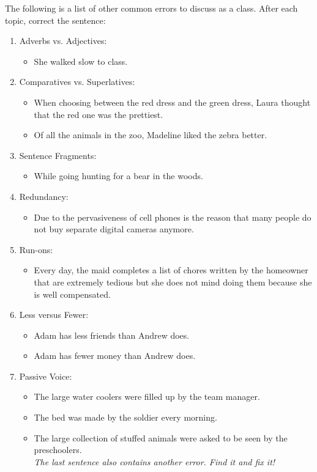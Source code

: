 \documentclass[12pt]{book}
\begin{document}
The following is a list of other common errors to discuss as a class. After each topic, correct the sentence:

\begin{enumerate}
\item Adverbs vs. Adjectives: \hrulefill
\begin{itemize}
\item She walked slow to class. 
\end{itemize}
\item Comparatives vs. Superlatives: \hrulefill
\begin{itemize}
\item When choosing between the red dress and the green dress, Laura thought that the red one was the prettiest. 
\item Of all the animals in the zoo, Madeline liked the zebra better. 
\end{itemize}
\item Sentence Fragments: \hrulefill
\begin{itemize}
\item While going hunting for a bear in the woods.
\end{itemize}
\item Redundancy: \hrulefill
\begin{itemize}
\item Due to the pervasiveness of cell phones is the reason that many people do not buy separate digital cameras anymore.
\end{itemize}
\item Run-ons: \hrulefill
\begin{itemize}
\item Every day, the maid completes a list of chores written by the homeowner that are extremely tedious but she does not mind doing them because she is well compensated. 
\end{itemize}

\item Less versus Fewer: \hrulefill
\begin{itemize}
\item Adam has less friends than Andrew does. 
\item Adam has fewer money than Andrew does. 
\end{itemize}

\item Passive Voice: \hrulefill
\begin{itemize}
\item The large water coolers were filled up by the team manager. 
\item The bed was made by the soldier every morning. 
\item The large collection of stuffed animals were asked to be seen by the preschoolers. \\
\textit{The last sentence also contains another error. Find it and fix it!}
\end{itemize}

\end{enumerate} 
\end{document}
